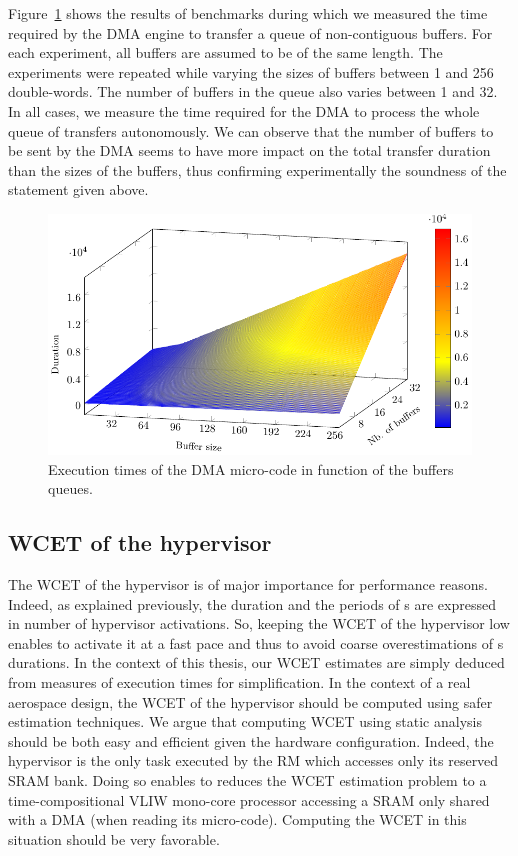 \documentclass[main.tex]{subfiles}
\begin{document}
\begin{description}
        Figure~\ref{fig_implemExecModel_hvETs} shows the results of benchmarks
        during which we measured the time required by the DMA engine to
        transfer a queue of non-contiguous buffers. For each experiment, all
        buffers are assumed to be of the same length. The experiments were
        repeated while varying the sizes of buffers between 1 and 256
        double-words. The number of buffers in the queue also varies between 1
        and 32. In all cases, we measure the time required for the DMA to
        process the whole queue of transfers autonomously. We can observe that
        the number of buffers to be sent by the DMA seems to have more impact
        on the total transfer duration than the sizes of the buffers, thus
        confirming experimentally the soundness of the statement given above.
\begin{figure}
    \centering
    \includegraphics{imgs/pdf/implemExecModel_hvETs.pdf}
    \caption{Execution times of the DMA micro-code in function of the buffers
    queues.}
    \label{fig_implemExecModel_hvETs}
\end{figure}
\end{description}

\subsection{WCET of the hypervisor}
\label{ssection_implemExecModel_systick}
The WCET of the hypervisor is of major importance for performance reasons.
Indeed, as explained previously, the duration and the periods of \PC{}s are
expressed in number of hypervisor activations. So, keeping the WCET of the
hypervisor low enables to activate it at a fast pace and thus to avoid coarse
overestimations of \PC{}s durations. In the context of this thesis, our WCET
estimates are simply deduced from measures of execution times for
simplification. In the context of a real aerospace design, the WCET of the
hypervisor should be computed using safer estimation techniques. We argue that
computing WCET using static analysis should be both easy and efficient given
the hardware configuration. Indeed, the hypervisor is the only task executed by
the RM which accesses only its reserved SRAM bank. Doing so enables to reduces
the WCET estimation problem to a time-compositional VLIW mono-core processor
accessing a SRAM only shared with a DMA (when reading its micro-code).
Computing the WCET in this situation should be very favorable.
\end{document}
